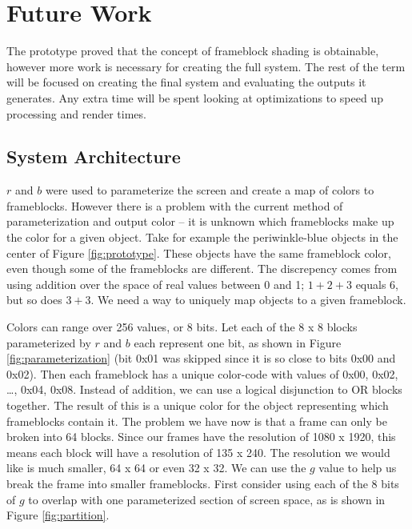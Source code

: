 \documentclass[conference]{IEEEtran}
\begin{document}
\section{Future Work}
\label{sec:future}
The prototype proved that the concept of frameblock shading is obtainable, however
more work is necessary for creating the full system.
The rest of the term will be focused on creating the final system and evaluating the outputs it generates.
Any extra time will be spent looking at optimizations to speed up processing and render times.

\subsection{System Architecture}
$r$ and $b$ were used to parameterize the screen
and create a map of colors to frameblocks.
However there is a problem with the current method of parameterization
and output color -- it is unknown which frameblocks make up the color
for a given object. Take for example the periwinkle-blue objects in the center of
Figure \ref{fig:prototype}. These objects have the same frameblock color, even though
some of the frameblocks are different.
The discrepency comes from using addition over the space of real values between 0 and 1;
$1 + 2 + 3$ equals $6$, but so does $3 + 3$. We need a way to uniquely map objects to a given frameblock.

Colors can range over 256 values, or 8 bits.
Let each of the 8 x 8 blocks parameterized by $r$ and $b$ each represent one bit,
as shown in Figure \ref{fig:parameterization}
(bit 0x01 was skipped since it is so close to bits 0x00 and 0x02).
Then each frameblock has a unique color-code with values of 0x00, 0x02, \dots, 0x04, 0x08.
Instead of addition, we can use a logical disjunction to OR blocks together.
The result of this is a unique color for the object representing which frameblocks contain it.
The problem we have now is that a frame can only be broken into 64 blocks.
Since our frames have the resolution of 1080 x 1920, this means each block will have
a resolution of 135 x 240. The resolution we would like is much smaller, 64 x 64
or even 32 x 32.
We can use the $g$ value to help us break the frame into smaller frameblocks.
First consider using each of the 8 bits of $g$ to overlap with one parameterized section of screen space,
as is shown in Figure \ref{fig:partition}.
\end{document}
